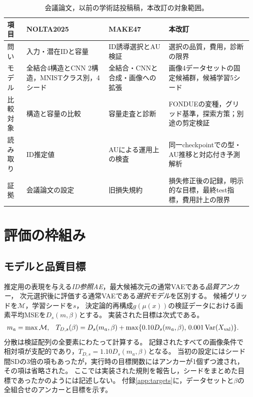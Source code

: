 \documentclass[11pt,a4paper]{ltjsarticle}
\begin{document}
\begin{table}[H]
\caption{会議論文，以前の学術誌投稿稿，本改訂の対象範囲。}
\label{tab:history}\small
\begin{tabularx}{\textwidth}{lXXX}\toprule
項目 & NOLTA2025 & MAKE47 & 本改訂 \\\midrule
問い & 入力・潜在IDと容量 & ID誘導選択とAU検証 & 選択の品質，費用，診断の限界 \\
モデル & 全結合4構造とCNN 2構造，MNISTクラス別，4シード & 全結合・CNNと合成・画像への拡張 & 画像4データセットの固定候補群，候補学習5シード \\
比較対象 & 構造と容量の比較 & 容量走査と診断 & FONDUEの変種，グリッド基準，探索方策；別途の剪定検証 \\
読み取り & ID推定値 & AUによる運用上の検査 & 同一checkpointでの型・AU推移と対応付き予測解析 \\
証拠 & 会議論文の設定 & 旧損失規約 & 損失修正後の記録，明示的な目標，最終test指標，費用計上の限界 \\
\bottomrule\end{tabularx}
\end{table}

\section{評価の枠組み}\label{sec:framework}

\subsection{モデルと品質目標}\label{sec:quality}
推定用の表現を与える\emph{ID参照AE}，最大候補次元の通常VAEである\emph{品質アンカー}，
次元選択後に評価する通常VAEである\emph{選択モデル}を区別する。
候補グリッドを$\mathcal M$，学習シードを$s$，
決定論的再構成$g(\mu(x))$の検証データにおける画素平均MSEを$D_s(m,\beta)$とする。
実装された目標は次式である。
\begin{align}
 m_a&=\max\mathcal M, &
 T_{D,s}(\beta)&=D_s(m_a,\beta)
 +\max\{0.10D_s(m_a,\beta),\,0.001\operatorname{Var}(X_{\rm val})\}.
 \label{eq:target}
\end{align}
分散は検証配列の全要素にわたって計算する。
記録されたすべての画像条件で相対項が支配的であり，$T_{D,s}=1.10D_s(m_a,\beta)$となる。
当初の設定にはシード間SDの3倍の項もあったが，実行時の目標関数にはアンカーが1個ずつ渡され，その項は省略された。
ここでは実装された規則を報告し，シードをまとめた目標であったかのようには記述しない。
付録\ref{app:targets}に，データセットと$\beta$の全組合せのアンカーと目標を示す。
\end{document}
